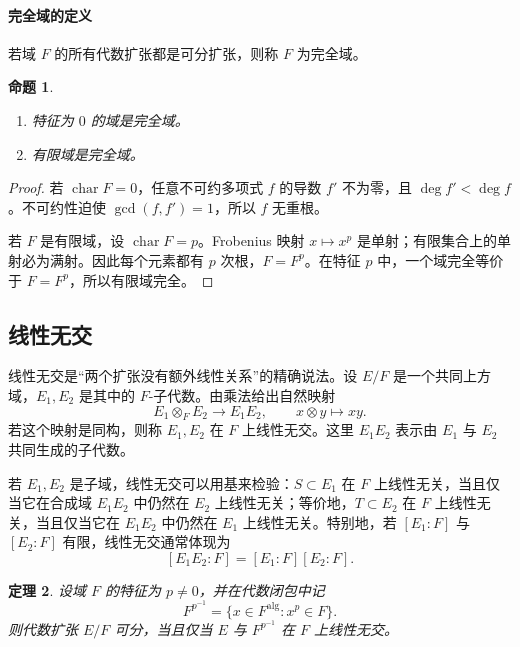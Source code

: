 \documentclass[11pt,a4paper,openany]{ctexbook}
\numberwithin{equation}{chapter}
\theoremstyle{plain}
\newtheorem{theorem}{定理}[chapter]
\newtheorem{proposition}[theorem]{命题}
\theoremstyle{definition}
\theoremstyle{remark}
\begin{document}
\paragraph{完全域的定义}
若域 $F$ 的所有代数扩张都是可分扩张，则称 $F$ 为完全域。

\begin{proposition}
\begin{enumerate}[label=(\arabic*)]
\item 特征为 $0$ 的域是完全域。
\item 有限域是完全域。
\end{enumerate}
\end{proposition}

\begin{proof}
若 $\operatorname{char}F=0$，任意不可约多项式 $f$ 的导数 $f'$ 不为零，且 $\deg f'<\deg f$。不可约性迫使 $\gcd(f,f')=1$，所以 $f$ 无重根。

若 $F$ 是有限域，设 $\operatorname{char}F=p$。Frobenius 映射 $x\mapsto x^p$ 是单射；有限集合上的单射必为满射。因此每个元素都有 $p$ 次根，$F=F^p$。在特征 $p$ 中，一个域完全等价于 $F=F^p$，所以有限域完全。
\end{proof}

\subsection{线性无交}

线性无交是“两个扩张没有额外线性关系”的精确说法。设 $E/F$ 是一个共同上方域，$E_1,E_2$ 是其中的 $F$-子代数。由乘法给出自然映射
\[
E_1\otimes_F E_2\longrightarrow E_1E_2,\qquad x\otimes y\longmapsto xy.
\]
若这个映射是同构，则称 $E_1,E_2$ 在 $F$ 上线性无交。这里 $E_1E_2$ 表示由 $E_1$ 与 $E_2$ 共同生成的子代数。

若 $E_1,E_2$ 是子域，线性无交可以用基来检验：$S\subset E_1$ 在 $F$ 上线性无关，当且仅当它在合成域 $E_1E_2$ 中仍然在 $E_2$ 上线性无关；等价地，$T\subset E_2$ 在 $F$ 上线性无关，当且仅当它在 $E_1E_2$ 中仍然在 $E_1$ 上线性无关。特别地，若 $[E_1:F]$ 与 $[E_2:F]$ 有限，线性无交通常体现为
\[
[E_1E_2:F]=[E_1:F][E_2:F].
\]

\begin{theorem}
设域 $F$ 的特征为 $p\ne0$，并在代数闭包中记
\[
F^{p^{-1}}=\{x\in F^{\mathrm{alg}}:x^p\in F\}.
\]
则代数扩张 $E/F$ 可分，当且仅当 $E$ 与 $F^{p^{-1}}$ 在 $F$ 上线性无交。
\end{theorem}
\end{document}
